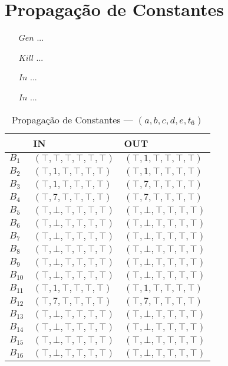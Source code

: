 \section{Propaga\c{c}\~ao de Constantes}

\begin{itemize}
  \item[$Gen$] ...
  \item[$Kill$] ...
  \item[$In$] ...
  \item[$In$] ...
\end{itemize}

\begin{table}[ht]
\centering
\begin{tabular}{l|l|l}
	& IN & OUT\\
\hline
$B_{1}$ &  $(\top,\top,\top,\top,\top,\top)$ & $(\top,1,\top,\top,\top,\top)$\\
$B_{2}$ &  $(\top,1,\top,\top,\top,\top)$ & $(\top,1,\top,\top,\top,\top)$\\
$B_{3}$ &  $(\top,1,\top,\top,\top,\top)$ & $(\top,7,\top,\top,\top,\top)$\\
$B_{4}$ &  $(\top,7,\top,\top,\top,\top)$ & $(\top,7,\top,\top,\top,\top)$\\
$B_{5}$ &  $(\top,\bot,\top,\top,\top,\top)$ & $(\top,\bot,\top,\top,\top,\top)$\\
$B_{6}$ &  $(\top,\bot,\top,\top,\top,\top)$ & $(\top,\bot,\top,\top,\top,\top)$\\
$B_{7}$ &  $(\top,\bot,\top,\top,\top,\top)$ & $(\top,\bot,\top,\top,\top,\top)$\\
$B_{8}$ &  $(\top,\bot,\top,\top,\top,\top)$ & $(\top,\bot,\top,\top,\top,\top)$\\
$B_{9}$ &  $(\top,\bot,\top,\top,\top,\top)$ & $(\top,\bot,\top,\top,\top,\top)$\\
$B_{10}$ &  $(\top,\bot,\top,\top,\top,\top)$ & $(\top,\bot,\top,\top,\top,\top)$\\
$B_{11}$ &  $(\top,1,\top,\top,\top,\top)$ & $(\top,1,\top,\top,\top,\top)$\\
$B_{12}$ &  $(\top,7,\top,\top,\top,\top)$ & $(\top,7,\top,\top,\top,\top)$\\
$B_{13}$ &  $(\top,\bot,\top,\top,\top,\top)$ & $(\top,\bot,\top,\top,\top,\top)$\\
$B_{14}$ &  $(\top,\bot,\top,\top,\top,\top)$ & $(\top,\bot,\top,\top,\top,\top)$\\
$B_{15}$ &  $(\top,\bot,\top,\top,\top,\top)$ & $(\top,\bot,\top,\top,\top,\top)$\\
$B_{16}$ &  $(\top,\bot,\top,\top,\top,\top)$ & $(\top,\bot,\top,\top,\top,\top)$\\
\end{tabular}
\caption{Propaga\c{c}\~ao de Constantes --- $(a, b, c, d, e, t_{6})$}
\end{table}

